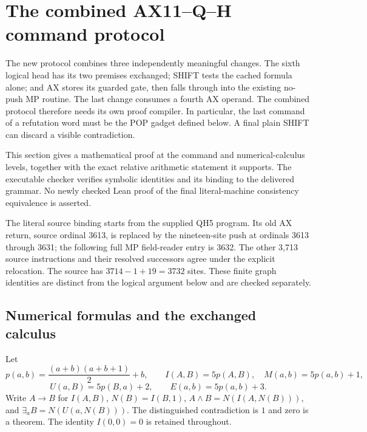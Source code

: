 \section{The combined AX11--Q--H command protocol}
\label{sec:ax11qh5-proof}

The new protocol combines three independently meaningful changes.  The
sixth logical head has its two premises exchanged; SHIFT tests the cached
formula alone; and AX stores its guarded gate, then falls through into the
existing no-push MP routine.  The last change consumes a fourth AX operand.
The combined protocol therefore needs its own proof compiler.  In
particular, the last command of a refutation word must be the POP gadget
defined below.  A final plain SHIFT can discard a visible contradiction.

This section gives a mathematical proof at the command and numerical-calculus
levels, together with the exact relative arithmetic statement it supports.
The executable checker verifies symbolic identities and its binding to the
delivered grammar.  No newly checked Lean proof of the final literal-machine
consistency equivalence is asserted.

The literal source binding starts from the supplied QH5 program.  Its old
AX return, source ordinal 3613, is replaced by the nineteen-site push at
ordinals 3613 through 3631; the following full MP field-reader entry is
3632.  The other 3,713 source instructions and their resolved successors
agree under the explicit relocation.  The source has
$3714-1+19=3732$ sites.  These finite graph identities are distinct from
the logical argument below and are checked separately.

\subsection{Numerical formulas and the exchanged calculus}

Let
\[
 p(a,b)=\frac{(a+b)(a+b+1)}2+b,
 \qquad
 I(A,B)=5p(A,B),\quad M(a,b)=5p(a,b)+1,
\]
\[
 U(a,B)=5p(B,a)+2,\qquad E(a,b)=5p(a,b)+3.
\]
Write $A\to B$ for $I(A,B)$, $N(B)=I(B,1)$,
$A\wedge B=N(I(A,N(B)))$, and $\exists_a B=N(U(a,N(B)))$.
The distinguished contradiction is $1$ and zero is a theorem.
The identity $I(0,0)=0$ is retained throughout.

